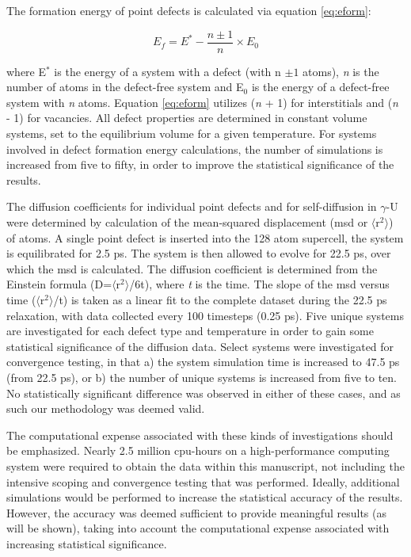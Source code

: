 \documentclass[review]{elsarticle}
\begin{document}
The formation energy of point defects is calculated via equation \ref{eq:eform}: 

\begin{equation}
\label{eq:eform}
E_f = E^* - \frac{n \pm 1}{n} \times E_0
\end{equation}

where E$^{*}$ is the energy of a system with a defect (with n $\pm 1$ atoms), \textit{n} is the number of atoms in the defect-free system and E$_{0}$ is the energy of a defect-free system with \textit{n} atoms. Equation \ref{eq:eform} utilizes (\textit{n} + 1) for interstitials and (\textit{n} - 1) for vacancies. All defect properties are determined in constant volume systems, set to the equilibrium volume for a given temperature. For systems involved in defect formation energy calculations, the number of simulations is increased from five to fifty, in order to improve the statistical significance of the results.

The diffusion coefficients for individual point defects and for self-diffusion in $\gamma$-U were determined by calculation of the mean-squared displacement (msd or $\langle$r$^2$$\rangle$) of atoms. A single point defect is inserted into the 128 atom supercell, the system is equilibrated for 2.5 ps. The system is then allowed to evolve for 22.5 ps, over which the msd is calculated. The diffusion coefficient is determined from the Einstein formula (D=$\langle$r$^2$$\rangle$/6t), where \textit{t} is the time. The slope of the msd versus time ($\langle$r$^2$$\rangle$/t) is taken as a linear fit to the complete dataset during the 22.5 ps relaxation, with data collected every 100 timesteps (0.25 ps). Five unique systems are investigated for each defect type and temperature in order to gain some statistical significance of the diffusion data. Select systems were investigated for convergence testing, in that a) the system simulation time is increased to 47.5 ps (from 22.5 ps), or b) the number of unique systems is increased from five to ten. No statistically significant difference was observed in either of these cases, and as such our methodology was deemed valid. 

The computational expense associated with these kinds of investigations should be emphasized. Nearly 2.5 million cpu-hours on a high-performance computing system were required to obtain the data within this manuscript, not including the intensive scoping and convergence testing that was performed. Ideally, additional simulations would be performed to increase the statistical accuracy of the results. However, the accuracy was deemed sufficient to provide meaningful results (as will be shown), taking into account the computational expense associated with increasing statistical significance. 
\end{document}
